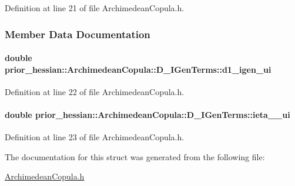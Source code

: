 Definition at line 21 of file Archimedean\+Copula.\+h.



\subsubsection{Member Data Documentation}
\paragraph[{\texorpdfstring{d1\+\_\+igen\+\_\+ui}{d1_igen_ui}}]{\setlength{\rightskip}{0pt plus 5cm}double prior\+\_\+hessian\+::\+Archimedean\+Copula\+::\+D\+\_\+\+I\+Gen\+Terms\+::d1\+\_\+igen\+\_\+ui}\hypertarget{structprior__hessian_1_1ArchimedeanCopula_1_1D__IGenTerms_a9a54c88cceb06c4b58875d06d355201f}{}\label{structprior__hessian_1_1ArchimedeanCopula_1_1D__IGenTerms_a9a54c88cceb06c4b58875d06d355201f}


Definition at line 22 of file Archimedean\+Copula.\+h.

\paragraph[{\texorpdfstring{ieta\+\_\+21\+\_\+ui}{ieta_21_ui}}]{\setlength{\rightskip}{0pt plus 5cm}double prior\+\_\+hessian\+::\+Archimedean\+Copula\+::\+D\+\_\+\+I\+Gen\+Terms\+::ieta\+\_\+\_\+ui}\hypertarget{structprior__hessian_1_1ArchimedeanCopula_1_1D__IGenTerms_a2ddab28b1ec16797477b79c5705d811a}{}\label{structprior__hessian_1_1ArchimedeanCopula_1_1D__IGenTerms_a2ddab28b1ec16797477b79c5705d811a}


Definition at line 23 of file Archimedean\+Copula.\+h.



The documentation for this struct was generated from the following file\+:\begin{DoxyCompactItemize}
\item 
\hyperlink{ArchimedeanCopula_8h}{Archimedean\+Copula.\+h}\end{DoxyCompactItemize}
